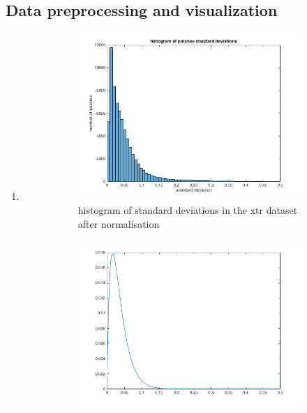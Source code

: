\documentclass{article}
\begin{document}
		\subsection{Data preprocessing and visualization}
			 \begin{enumerate}[label=(\alph*)]
			 	\item
				 	\begin{figure}[t]
				 		\centering
				 		\caption{patch images}
				 		\label{fig:patch_images}
				 		\begin{subfigure}{0.5\textwidth}
				 			\includegraphics[width=\linewidth]{images/p1-1-a_std_hist}
				 			\caption{histogram of standard deviations in the xtr dataset after normalisation}
				 			\label{fig:p1-1-a_std_hist}
				 		\end{subfigure}%
				 		\begin{subfigure}{0.5\textwidth}
				 			\includegraphics[width=\linewidth]{images/p1-1-a_dist}

\end{subfigure}
\end{figure}
\end{enumerate}
\end{document}
